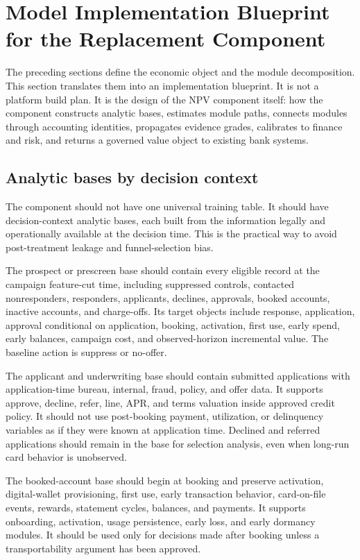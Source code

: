 \documentclass[11pt]{article}
\newcommand{\1}{\mathbf{1}}
\begin{document}
\section{Model Implementation Blueprint for the Replacement Component}
\label{sec:model-implementation-blueprint}

The preceding sections define the economic object and the module
decomposition. This section translates them into an implementation blueprint.
It is not a platform build plan. It is the design of the NPV component itself:
how the component constructs analytic bases, estimates module paths, connects
modules through accounting identities, propagates evidence grades, calibrates
to finance and risk, and returns a governed value object to existing bank
systems.

\subsection{Analytic bases by decision context}
\label{subsec:analytic-bases}

The component should not have one universal training table. It should have
decision-context analytic bases, each built from the information legally and
operationally available at the decision time. This is the practical way to
avoid post-treatment leakage and funnel-selection bias.

The prospect or prescreen base should contain every eligible record at the
campaign feature-cut time, including suppressed controls, contacted
nonresponders, responders, applicants, declines, approvals, booked accounts,
inactive accounts, and charge-offs. Its target objects include response,
application, approval conditional on application, booking, activation, first
use, early spend, early balances, campaign cost, and observed-horizon
incremental value. The baseline action is suppress or no-offer.

The applicant and underwriting base should contain submitted applications with
application-time bureau, internal, fraud, policy, and offer data. It supports
approve, decline, refer, line, APR, and terms valuation inside approved credit
policy. It should not use post-booking payment, utilization, or delinquency
variables as if they were known at application time. Declined and referred
applications should remain in the base for selection analysis, even when
long-run card behavior is unobserved.

The booked-account base should begin at booking and preserve activation,
digital-wallet provisioning, first use, early transaction behavior,
card-on-file events, rewards, statement cycles, balances, and payments. It
supports onboarding, activation, usage persistence, early loss, and early
dormancy modules. It should be used only for decisions made after booking
unless a transportability argument has been approved.
\end{document}
